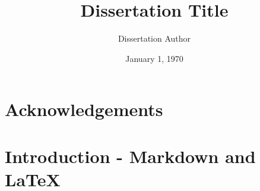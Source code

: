 \documentclass[11pt,report]{uncdissertation}
\title{}
\author{}
\date{}
\begin{document}
\title{Dissertation Title}
\author{Dissertation Author}
\date{January 1, 1970}


\dedication{To someone}

\pagestyle{plain}

\frontmatter{}


\maketitlepg
\makecopyrightpg
\makeabstractpg
\makededicationpg

\chapter*{Acknowledgements}



%


\newlength{\oldbaselineskip}
\setlength{\oldbaselineskip}{\the\baselineskip}
\newlength{\oldparskip}
\setlength{\oldparskip}{\the\parskip}


\newpage

\setlength{\baselineskip}{0.5\oldbaselineskip}
\setlength{\parskip}{0.5\oldbaselineskip}


\tableofcontents

\newpage

\listoffigures

\newpage

\listoftables


\setlength{\baselineskip}{1.0\oldbaselineskip}
\setlength{\parskip}{1.0\oldparskip}

\listofabbreviations

\mainmatter

\chapter{Introduction - Markdown and \LaTeX\label{intro}}
\end{document}
